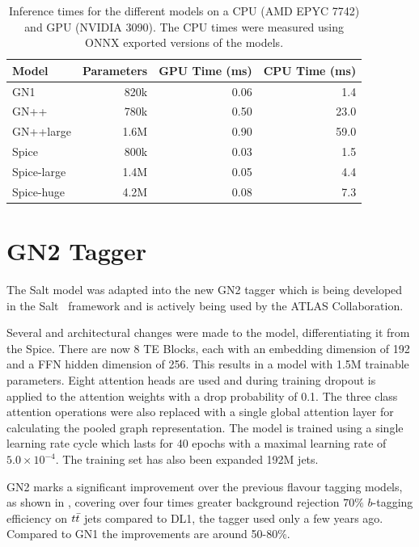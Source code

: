 \begin{table}
    \centering
    \begin{tabular}{lrrr}
        \toprule
        Model & Parameters & GPU Time (ms) & CPU Time (ms) \\
        \midrule
        GN1 & 820k & 0.06 & 1.4 \\
        GN++ & 780k & 0.50 & 23.0 \\
        GN++large & 1.6M & 0.90 & 59.0 \\
        Spice & 800k & 0.03 & 1.5 \\
        Spice-large & 1.4M & 0.05 & 4.4 \\
        Spice-huge & 4.2M & 0.08 & 7.3 \\
        \bottomrule
    \end{tabular}
    \caption{Inference times for the different models on a CPU (AMD EPYC 7742) and GPU (NVIDIA 3090). The CPU times were measured using ONNX exported versions of the models.}
    \label{tab:inference}
\end{table}

\section{GN2 Tagger}

The Salt model was adapted into the new GN2 tagger which is being developed in the Salt~\cite{Salt} framework and is actively being used by the ATLAS Collaboration.

Several and architectural changes were made to the model, differentiating it from the Spice.
There are now 8 TE Blocks, each with an embedding dimension of 192 and a FFN hidden dimension of 256.
This results in a model with 1.5M trainable parameters.
Eight attention heads are used and during training dropout is applied to the attention weights with a drop probability of 0.1.
The three class attention operations were also replaced with a single global attention layer for calculating the pooled graph representation.
The model is trained using a single learning rate cycle which lasts for 40 epochs with a maximal learning rate of $5.0 \times 10^{-4}$.
The training set has also been expanded 192M jets.

GN2 marks a significant improvement over the previous flavour tagging models, as shown in , covering over four times greater background rejection $70\%$ $b$-tagging efficiency on $t\bar{t}$ jets compared to DL1, the tagger used only a few years ago.
Compared to GN1 the improvements are around 50-80\%.

